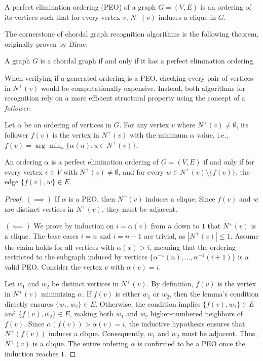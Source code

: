 \begin{definition}
A perfect elimination ordering (PEO) of a graph $G = (V, E)$ is an ordering of its vertices such that for every vertex $v$, $N^+(v)$ induces a clique in $G$.
\end{definition}

The cornerstone of chordal graph recognition algorithms is the following theorem, originally proven by Dirac:

\begin{theorem} \textup{\cite{Dirac1961}}
A graph $G$ is a chordal graph if and only if it has a perfect elimination ordering.
\end{theorem}

When verifying if a generated ordering is a PEO, checking every pair of vertices in $N^+(v)$ would be computationally expensive. Instead, both algorithms for recognition rely on a more efficient structural property using the concept of a \textit{follower}.

\begin{definition}[Follower]
Let $\alpha$ be an ordering of vertices in $G$. For any vertex $v$ where $N^+(v) \neq \emptyset$, its follower $f(v)$ is the vertex in $N^+(v)$ with the minimum $\alpha$ value, i.e., $f(v) = \arg\min_u\{\alpha(u) \colon u \in N^+(v)\}$.
\end{definition}

\begin{lemma}
\label{lem:peo_follower}
An ordering $\alpha$ is a perfect elimination ordering of $G = (V, E)$ if and only if for every vertex $v \in V$ with $N^+(v) \neq \emptyset$, and for every $w \in N^+(v) \setminus \{f(v)\}$, the edge $\{f(v), w\} \in E$.
\end{lemma}

\begin{proof}
$(\implies)$ If $\alpha$ is a PEO, then $N^+(v)$ induces a clique. Since $f(v)$ and $w$ are distinct vertices in $N^+(v)$, they must be adjacent.

$(\impliedby)$ We prove by induction on $i = \alpha(v)$ from $n$ down to $1$ that $N^+(v)$ is a clique. The base cases $i=n$ and $i=n-1$ are trivial, as $|N^+(v)| \le 1$. Assume the claim holds for all vertices with $\alpha(x) > i$, meaning that the ordering restricted to the subgraph induced by vertices $\{\alpha^{-1}(n), \dots, \alpha^{-1}(i+1)\}$ is a valid PEO. Consider the vertex $v$ with $\alpha(v) = i$. 

Let $w_1$ and $w_2$ be distinct vertices in $N^+(v)$. By definition, $f(v)$ is the vertex in $N^+(v)$ minimizing $\alpha$. If $f(v)$ is either $w_1$ or $w_2$, then the lemma's condition directly ensures $\{w_1, w_2\} \in E$. Otherwise, the condition implies $\{f(v), w_1\} \in E$ and $\{f(v), w_2\} \in E$, making both $w_1$ and $w_2$ higher-numbered neighbors of $f(v)$. Since $\alpha(f(v)) > \alpha(v) = i$, the inductive hypothesis ensures that $N^+(f(v))$ induces a clique. Consequently, $w_1$ and $w_2$ must be adjacent. Thus, $N^+(v)$ is a clique. The entire ordering $\alpha$ is confirmed to be a PEO once the induction reaches $1$.
\end{proof}

